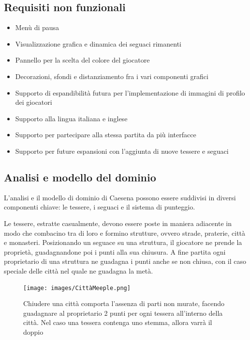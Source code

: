 \subsection*{Requisiti non funzionali}
\begin{itemize}
\item Menù di pausa
\item Visualizzazione grafica e dinamica dei seguaci rimanenti 
\item Pannello per la scelta del colore del giocatore
\item Decorazioni, sfondi e distanziamento fra i vari componenti grafici
\item Supporto di espandibilità futura per l'implementazione di immagini di profilo dei giocatori
\item Supporto alla lingua italiana e inglese
\item Supporto per partecipare alla stessa partita da più interfacce
\item Supporto per future espansioni con l'aggiunta di nuove tessere e seguaci
\end{itemize}

\subsection{Analisi e modello del dominio}
L'analisi e il modello di dominio di Caesena possono essere suddivisi in diversi componenti chiave: le tessere, i seguaci e il sistema di punteggio.

Le tessere, estratte casualmente, devono essere poste in maniera adiacente in modo che combacino tra di loro e formino strutture, ovvero strade, praterie, città e monasteri. Posizionando un seguace su una struttura, il giocatore ne prende la proprietà, guadagnandone poi i punti alla sua chiusura. A fine partita ogni proprietario di una struttura ne guadagna i punti anche se non chiusa, con il caso speciale delle città nel quale ne guadagna la metà.

\begin{figure}[hb]
    {\texttt{[image: images/CittàMeeple.png]}}

    \caption{Chiudere una città comporta l’assenza di parti non murate, facendo guadagnare al proprietario 2 punti per ogni tessera all'interno della città. Nel caso una tessera contenga uno stemma, allora varrà il doppio}
\end{figure}

